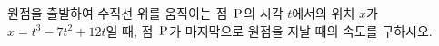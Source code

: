 원점을 출발하여 수직선 위를 움직이는 점~$\mathrm{P}$의 시각 $t$에서의 위치 $x$가 $x=t^3-7t^2+12t$일 때, 점~$\mathrm{P}$가 마지막으로 원점을 지날 때의 속도를 구하시오.
